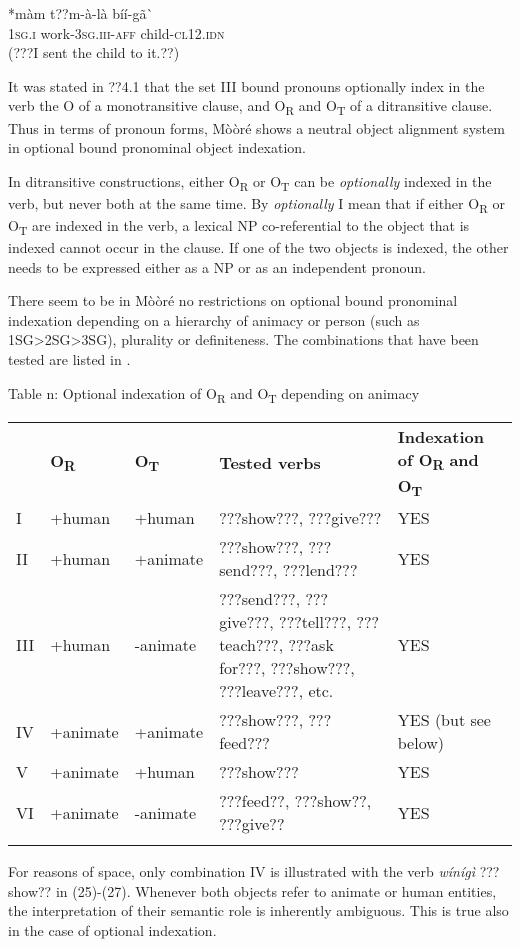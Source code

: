 \documentclass[output=paper]{langsci/langscibook}
\begin{document}
\ea \gll 
\label{bkm:Ref424201839}*màm  t??m-à-là      bíí-gã\`{ }
\\
%
\textsc{1sg.i  }  work-\textsc{3sg.iii-aff}    child-\textsc{cl12.idn}
\\\glt
(???I sent the child to it.??)
\z

It was stated in ??4.1 that the set III bound pronouns optionally index in the verb the O of a monotransitive clause, and O\textsubscript{R} and O\textsubscript{T }of a ditransitive clause. Thus in terms of pronoun forms, Mòòré shows a neutral object alignment system in optional bound pronominal object indexation.  

In ditransitive constructions, either O\textsubscript{R} or O\textsubscript{T} can be \textit{optionally} indexed in the verb, but never both at the same time. By \textit{optionally} I mean that if either O\textsubscript{R} or O\textsubscript{T} are indexed in the verb, a lexical NP co-referential to the object that is indexed cannot occur in the clause. If one of the two objects is indexed, the other needs to be expressed either as a NP or as an independent pronoun. 

There seem to be in Mòòré no restrictions on optional bound pronominal indexation depending on a hierarchy of animacy or person (such as 1SG{\textgreater}2SG{\textgreater}3SG), plurality or definiteness. The combinations that have been tested are listed in .

\begin{table}\caption{
\label{bkm:Ref444780805}Table n: Optional indexation of O\textsubscript{R} and O\textsubscript{T} depending on animacy
}\end{table}

\begin{tabularx}{\textwidth}{XXXXX} & \textbf{O}\textbf{\textsubscript{R}} & \textbf{O}\textbf{\textsubscript{T}} & \textbf{Tested verbs} & \textbf{Indexation of O}\textbf{\textsubscript{R}}\textbf{ and O}\textbf{\textsubscript{T}}\textbf{ }\\
\lsptoprule
I & +human & +human & ???show???, ???give??? & YES\\
II & +human & +animate & ???show???, ???send???, ???lend??? & YES\\
III & +human & {}-animate & ???send???, ???give???, ???tell???, ???teach???, ???ask for???, ???show???, ???leave???, etc. & YES\\
IV & +animate & +animate & ???show???, ???feed??? & YES (but see below)\\
V & +animate & +human & ???show??? & YES\\
VI & +animate & {}-animate & ???feed??, ???show??, ???give?? & YES\\
\lspbottomrule
\end{tabularx}
For reasons of space, only combination IV is illustrated with the verb \textit{wínígì} ???show?? in (25){}-(27). Whenever both objects refer to animate or human entities, the interpretation of their semantic role is inherently ambiguous. This is true also in the case of optional indexation.
\end{document}
